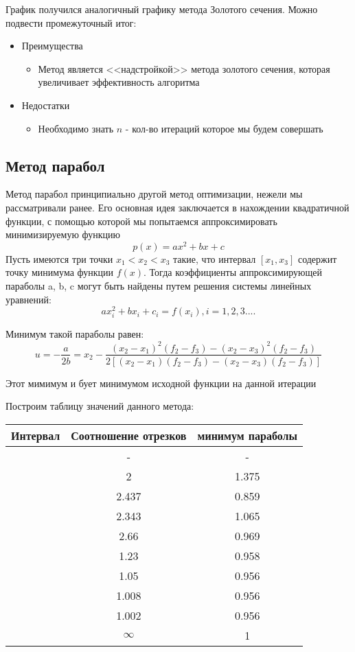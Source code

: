 \documentclass[a4paper, 14pt]{article}
\begin{document}
	График получился аналогичный графику метода Золотого сечения. 
	Можно подвести промежуточный итог:
	
	\begin{itemize}
		\item Преимущества
			\begin{itemize}
				\item Метод является <<надстройкой>> метода золотого сечения, которая увеличивает эффективность алгоритма
 			\end{itemize}
		\item Недостатки
			\begin{itemize}
			\item Необходимо знать $n$ - кол-во итераций которое мы будем совершать 
			\end{itemize}
	\end{itemize}
	
	\subsection*{Метод парабол}
	Метод парабол принципиально другой метод оптимизации, нежели мы рассматривали ранее. Его основная идея заключается в нахождении квадратичной функции, с помощью которой мы попытаемся аппроксимировать минимизируемую функцию
	\[p(x) = ax^2 + bx + c\]
	Пусть имеются три точки $x_1 < x_2 < x_3$ такие, что интервал $[x_1, x_3]$ содержит точку минимума функции $f(x)$. Тогда
коэффициенты аппроксимирующей параболы a, b, c могут быть найдены путем решения системы линейных
уравнений:
\[ax^{2}_i + bx_i + c_i = f(x_i), i = 1, 2, 3 ....\]

Минимум такой параболы равен:
\[u = -\frac{a}{2b} = x_2 - \frac{(x_2 - x_1)^2(f_2 - f_3) - (x_2 - x_3)^2(f_2 - f_3)}{2[(x_2 - x_1)(f_2 - f_3) - (x_2 - x_3)(f_2 - f_3)]}\]

Этот мимимум и бует минимумом исходной функции на данной итерации
 
 Построим таблицу значений данного метода:\\
 
 \begin{tabular}{|c |c| c|}
		\hline
		Интервал & Соотношение отрезков & минимум параболы \\
		\hline
		[0.5, 4] & - & - \\
		\hline
		[0.5, 2.25] & 2 & 1.375\\
\hline
[0.5, 1.218] & 2.437 & 0.859\\
\hline
[0.912, 1.218] & 2.343 & 1.065\\
\hline
[0.912, 1.027] & 2.66 & 0.969\\
\hline
[0.912, 1.005] & 1.23 & 0.958\\
\hline
[0.912, 1.001] & 1.05 & 0.956\\
\hline
[0.912, 1] & 1.008 & 0.956\\
\hline
[0.912, 1] & 1.002 & 0.956\\
\hline
[1, 1] & $\infty$ & 1\\
\hline
	\end{tabular} \\\\
	
\end{document}
